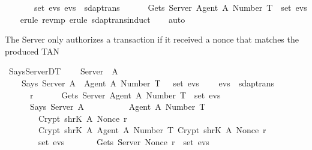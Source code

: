 \begin{isabellebody}
  \ \ \ \ \ {\isasymrbrace}\ {\isasymin}\ set\ evs{\isacharsemicolon}\ evs\ {\isasymin}\ sdaptrans\ {\isasymrbrakk}\isanewline
  \ \ \ \ {\isasymLongrightarrow}\ Gets\ Server\ {\isasymlbrace}Agent\ A{\isacharcomma}\ Number\ T{\isasymrbrace}\ {\isasymin}\ set\ evs{\isachardoublequoteclose}\isanewline
  \isadelimproof
  \isanewline
  \ \ %
  \endisadelimproof
  \isatagproof
  \isamarkupfalse%
  \ {\isacharparenleft}erule\ rev{\isacharunderscore}mp{\isacharcomma}\ erule\ sdaptrans{\isachardot}induct{\isacharparenright}\isanewline
  \ \ \isamarkupfalse%
  \ {\isacharparenleft}auto{\isacharparenright}\isanewline
  \isamarkupfalse%
  \endisatagproof
  {\isafoldproof}%
  \isadelimproof
  \endisadelimproof
  \begin{isamarkuptext}%
  The Server only authorizes a transaction if it received a nonce that matches the produced TAN%
  \end{isamarkuptext}\isamarkuptrue%
  \isamarkupfalse%
  \ Says{\isacharunderscore}Server{\isacharunderscore}DT{}\ {\isacharcolon}\isanewline
  \ \ {\isachardoublequoteopen}{\isasymlbrakk}\ Server\ {\isasymnoteq}\ A{\isacharsemicolon}\isanewline
  \ \ \ \ Says\ Server\ A\ {\isasymlbrace}\ Agent\ A{\isacharcomma}\ Number\ T\ {\isasymrbrace}\ {\isasymin}\ set\ evs{\isacharsemicolon}\isanewline
  \ \ \ \ evs\ {\isasymin}\ sdaptrans\ {\isasymrbrakk}\isanewline
  \ \ \ \ {\isasymLongrightarrow}\ {\isasymexists}\ r{\isachardot}\isanewline
  \ \ \ \ \ \ Gets\ Server\ {\isasymlbrace}Agent\ A{\isacharcomma}\ Number\ T{\isasymrbrace}\ {\isasymin}\ set\ evs\ {\isasymand}\isanewline
  \ \ \ \ \ \ Says\ Server\ A\ {\isasymlbrace}\ \isanewline
  \ \ \ \ \ \ \ \ {\isasymlbrace}Agent\ A{\isacharcomma}\ Number\ T{\isasymrbrace}{\isacharcomma}\ \isanewline
  \ \ \ \ \ \ \ \ Crypt\ {\isacharparenleft}shrK\ A{\isacharparenright}\ {\isacharparenleft}Nonce\ r{\isacharparenright}{\isacharcomma}\isanewline
  \ \ \ \ \ \ \ \ Crypt\ {\isacharparenleft}shrK\ A{\isacharparenright}\ {\isasymlbrace}{\isasymlbrace}Agent\ A{\isacharcomma}\ Number\ T{\isasymrbrace}{\isacharcomma}\ Crypt\ {\isacharparenleft}shrK\ A{\isacharparenright}\ {\isacharparenleft}Nonce\ r{\isacharparenright}{\isasymrbrace}\isanewline
  \ \ \ \ \ \ {\isasymrbrace}\ {\isasymin}\ set\ evs\ {\isasymand}\isanewline
  \ \ \ \ \ \ Gets\ Server\ {\isacharparenleft}Nonce\ r{\isacharparenright}\ {\isasymin}\ set\ evs{\isachardoublequoteclose}\isanewline
  \isadelimproof
  \isanewline
  \ \ %
  \endisadelimproof
  \isatagproof

\end{isabellebody}
